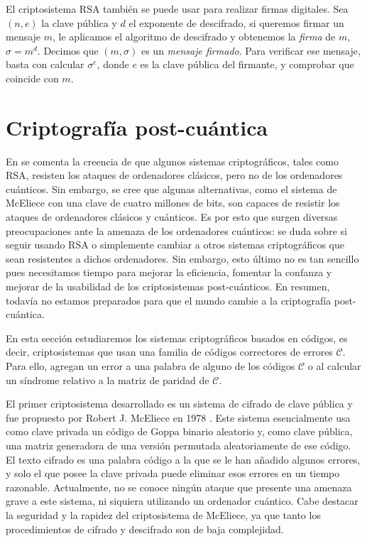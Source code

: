 El criptosistema RSA también se puede usar para realizar firmas digitales. Sea $(n, e)$ la clave pública y $d$ el exponente de descifrado, si queremos firmar un mensaje $m$, le aplicamos el algoritmo de descifrado y obtenemos la \emph{firma} de $m$, $\sigma = m^d$. Decimos que $(m, \sigma)$ es un \emph{mensaje firmado}. Para verificar ese mensaje, basta con calcular $\sigma ^e$, donde $e$ es la clave pública del firmante, y comprobar que coincide con $m$.

\section{Criptografía post-cuántica}

En \cite{Post-Quantum_Cryptography_2009} se comenta la creencia de que algunos sistemas criptográficos, tales como RSA, resisten los ataques de ordenadores clásicos, pero no de los ordenadores cuánticos. Sin embargo, se cree que algunas alternativas, como el sistema de McEliece con una clave de cuatro millones de bits, son capaces de resistir los ataques de ordenadores clásicos y cuánticos. Es por esto que surgen diversas preocupaciones ante la amenaza de los ordenadores cuánticos: se duda sobre si seguir usando RSA o simplemente cambiar a otros sistemas criptográficos que sean resistentes a dichos ordenadores. Sin embargo, esto último no es tan sencillo pues necesitamos tiempo para mejorar la eficiencia, fomentar la confanza y mejorar de la usabilidad de los criptosistemas post-cuánticos. En resumen, todavía no estamos preparados para que el mundo cambie a la criptografía post-cuántica.

En esta sección estudiaremos los sistemas criptográficos basados en códigos, es decir, criptosistemas que usan una familia de códigos correctores de errores $\mathcal{C}$. Para ello, agregan un error a una palabra de alguno de los códigos $\mathcal{C}$ o al calcular un síndrome relativo a la matriz de paridad de $\mathcal{C}$.

El primer criptosistema desarrollado es un sistema de cifrado de clave pública y fue propuesto por Robert J. McEliece en 1978 \cite{McEliece_1978}. Este sistema esencialmente usa como clave privada un código de Goppa binario aleatorio y, como clave pública, una matriz generadora de una versión permutada aleatoriamente de ese código. El texto cifrado es una palabra código a la que se le han añadido algunos errores, y solo el que posee la clave privada puede eliminar esos errores en un tiempo razonable. Actualmente, no se conoce ningún ataque que presente una amenaza grave a este sistema, ni siquiera utilizando un ordenador cuántico. Cabe destacar la seguridad y la rapidez del criptosistema de McEliece, ya que tanto los procedimientos de cifrado y descifrado son de baja complejidad.


